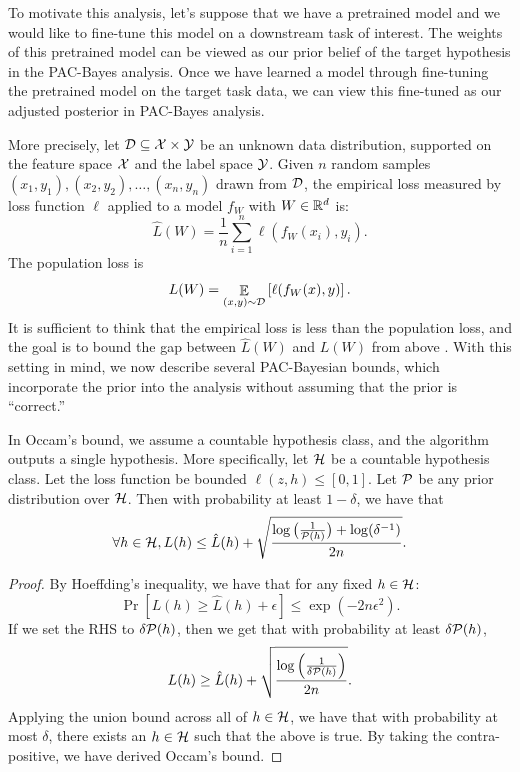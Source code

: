 To motivate this analysis, let's suppose that we have a pretrained model and we would like to fine-tune this model on a downstream task of interest.
The weights of this pretrained model can be viewed as our prior belief of the target hypothesis in the PAC-Bayes analysis.
Once we have learned a model through fine-tuning the pretrained model on the target task data, we can view this fine-tuned as our adjusted posterior in PAC-Bayes analysis.

More precisely, let $\mathcal{D} \subseteq \mathcal{X} \times \mathcal{Y}$ be an unknown data distribution, supported on the feature space $\mathcal{X}$ and the label space $\mathcal{Y}$.
Given $n$ random samples $(x_1, y_1), (x_2, y_2), \dots, (x_n, y_n)$ drawn from $\mathcal{D}$, the empirical loss measured by loss function $\ell$ applied to a model $f_W$ with $W \in \mathbb{R}^d$ is:
\[ \hat L(W) = \frac 1 n \sum_{i = 1}^n \ell(f_W(x_i), y_i). \]
The population loss is %
\[ L(W) = \mathop{\mathbb{E}}_{(x, y) \sim \mathcal{D}}\left[ \ell(f_W(x), y) \right]. \]
It is sufficient to think that the empirical loss is less than the population loss, and the goal is to bound the gap between $\hat L(W)$ and $L(W)$ from above \citep{shalev2014understanding}.
With this setting in mind, we now describe several PAC-Bayesian bounds, which incorporate the prior into the analysis without assuming that the prior is ``correct.''

In Occam's bound, we assume a countable hypothesis class, and the algorithm outputs a single hypothesis.
More specifically, let $\mathcal{H}$ be a countable hypothesis class.
Let the loss function be bounded $\ell(z, h) \le [0, 1]$.
Let $\mathcal{P}$ be any prior distribution over $\mathcal{H}$.
Then with probability at least $1 - \delta$, we have that
\[ \forall h \in \mathcal{H}, L(h) \le \hat L(h) + \sqrt{\frac {\log\big(\frac 1 {\mathcal{P}(h)}\big) + \log(\delta^{-1})} {2n}}. \]

\begin{proof}
By Hoeffding's inequality, we have that for any fixed $h\in \mathcal{H}$:
\[ \Pr[L(h) \ge \hat L(h) + \epsilon] \le \exp(-2n \epsilon^2). \]
If we set the RHS to $\delta \mathcal{P}(h)$, then we get that with probability at least $\delta \mathcal{P}(h)$,
\[ L(h) \ge \hat L(h) + \sqrt{ \frac {\log\Big( \frac 1 {\delta \mathcal{P}(h)}\Big)} {2n}}. \]
Applying the union bound across all of $h \in \mathcal{H}$, we have that with probability at most $\delta$,
there exists an $h \in \mathcal{H}$ such that the above is true.
By taking the contra-positive, we have derived Occam's bound.
\end{proof}


